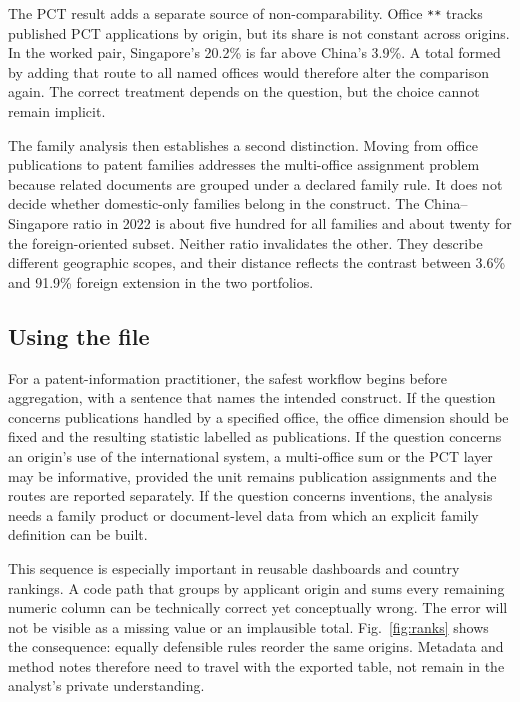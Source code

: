 \documentclass[a4paper,fleqn]{cas-dc}
\begin{document}
The PCT result adds a separate source of non-comparability. Office
\texttt{**} tracks published PCT applications by origin, but its share is not
constant across origins. In the worked pair, Singapore's 20.2\% is far above
China's 3.9\%. A total formed by adding that route to all named offices would
therefore alter the comparison again. The correct treatment depends on the
question, but the choice cannot remain implicit.

The family analysis then establishes a second distinction. Moving from
office publications to patent families addresses the multi-office assignment
problem because related documents are grouped under a declared family rule.
It does not decide whether domestic-only families belong in the construct.
The China--Singapore ratio in 2022 is about five hundred for all families and
about twenty for the foreign-oriented subset. Neither ratio invalidates the
other. They describe different geographic scopes, and their distance reflects
the contrast between 3.6\% and 91.9\% foreign extension in the two portfolios.

\subsection{Using the file}\label{sec:using}

For a patent-information practitioner, the safest workflow begins before
aggregation, with a sentence that names the intended construct. If the
question concerns publications handled by a specified office, the office
dimension should be fixed and the resulting statistic labelled as
publications. If the question concerns an origin's use of the international
system, a multi-office sum or the PCT layer may be informative, provided the
unit remains publication assignments and the routes are reported separately.
If the question concerns inventions, the analysis needs a family product or
document-level data from which an explicit family definition can be built.

This sequence is especially important in reusable dashboards and country
rankings. A code path that groups by applicant origin and sums every remaining
numeric column can be technically correct yet conceptually wrong. The error
will not be visible as a missing value or an implausible total. Fig.~\ref{fig:ranks}
shows the consequence: equally defensible rules reorder the same origins.
Metadata and method notes therefore need to travel with the exported table,
not remain in the analyst's private understanding.
\end{document}
